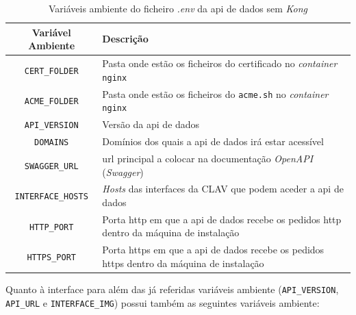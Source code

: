 \begin{table}[H]
\fontsize{10}{12}\selectfont
\begin{tabularx}{\textwidth}{|c|X|}
    \hline
    Variável Ambiente & Descrição \\ \hline
    \texttt{CERT\_FOLDER} & Pasta onde estão os ficheiros do certificado no \textit{container} \texttt{nginx} \\ \hline
    \texttt{ACME\_FOLDER} & Pasta onde estão os ficheiros do \texttt{acme.sh} no \textit{container} \texttt{nginx} \\ \hline
    \texttt{API\_VERSION} & Versão da \acrshort{api} de dados \\ \hline
    \texttt{DOMAINS} & Domínios dos quais a \acrshort{api} de dados irá estar acessível \\ \hline
    \texttt{SWAGGER\_URL} & \acrshort{url} principal a colocar na documentação \textit{OpenAPI} (\textit{Swagger}) \\ \hline
    \texttt{INTERFACE\_HOSTS} & \textit{Hosts} das interfaces da CLAV que podem aceder a \acrshort{api} de dados \\ \hline
    \texttt{HTTP\_PORT} & Porta \acrshort{http} em que a \acrshort{api} de dados recebe os pedidos \acrshort{http} dentro da máquina de instalação \\ \hline
    \texttt{HTTPS\_PORT} & Porta \acrshort{https} em que a \acrshort{api} de dados recebe os pedidos \acrshort{https} dentro da máquina de instalação \\ \hline
\end{tabularx}
\caption{Variáveis ambiente do ficheiro \textit{.env} da \acrshort{api} de dados sem \textit{Kong}}
\end{table}

Quanto à interface para além das já referidas variáveis ambiente (\texttt{API\_VERSION}, \texttt{API\_URL} e \texttt{INTERFACE\_IMG}) possui também as seguintes variáveis ambiente:

